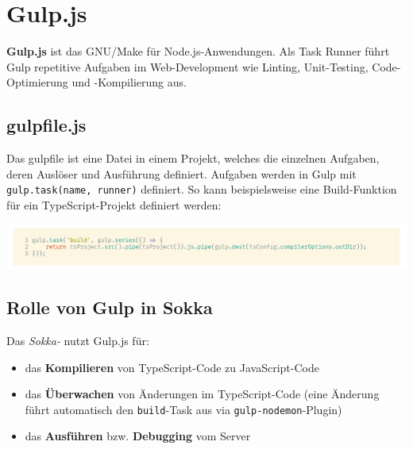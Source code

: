 \section{Gulp.js}
\label{gulpjs}

\textbf{Gulp.js} ist das GNU/Make für Node.js-Anwendungen. Als Task Runner führt Gulp repetitive Aufgaben im Web-Development wie Linting, Unit-Testing, Code-Optimierung und -Kompilierung aus.

\subsection{gulpfile.js}

Das gulpfile ist eine Datei in einem Projekt, welches die einzelnen Aufgaben, deren Auslöser und Ausführung definiert. Aufgaben werden in Gulp mit \lstinline{gulp.task(name, runner)} definiert. So kann beispielsweise eine Build-Funktion für ein TypeScript-Projekt definiert werden:

\begin{code}[htp]
    \begin{center}
        \includegraphics[width=1\textwidth]{images/Dependencies/gulpfile.png}
        \vspace{-25pt}
        \caption{Beispielhaftes \lstinline{gulpfile.js} zum Kompilieren von TypeScript}
    \end{center}
\end{code}

\subsection{Rolle von Gulp in Sokka}

Das \textit{Sokka-} nutzt Gulp.js für:

\begin{itemize}
    \item das \textbf{Kompilieren} von TypeScript-Code zu JavaScript-Code
    \item das \textbf{Überwachen} von Änderungen im TypeScript-Code (eine Änderung führt automatisch den \lstinline{build}-Task aus via \lstinline{gulp-nodemon}-Plugin)
    \item das \textbf{Ausführen} bzw. \textbf{Debugging} vom Server
\end{itemize}